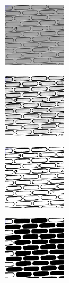 \documentclass[pdftex,12pt,a4paper]{report}
\begin{document}
\begin{figure}[H]
\centering

\begin{subfigure}{\textwidth}
  \centering
  \includegraphics[width=0.3\textwidth]{images/trench_detect_1}
  \caption{}
  \label{fig:orig_pic}
\end{subfigure}%

\begin{subfigure}{\textwidth}
  \centering
  \includegraphics[width=0.3\textwidth]{images/trench_detect_2}
  \caption{}
  \label{fig:brcon_adj}
\end{subfigure}%

\begin{subfigure}{\textwidth}
  \centering
  \includegraphics[width=0.3\textwidth]{images/trench_detect_3}
  \caption{}
  \label{fig:rats}
\end{subfigure}%

\begin{subfigure}{\textwidth}
  \centering
  \includegraphics[width=0.3\textwidth]{images/trench_detect_4}
  \caption{}
  \label{fig:fill_holes}
\end{subfigure}%


\end{figure}
\end{document}
